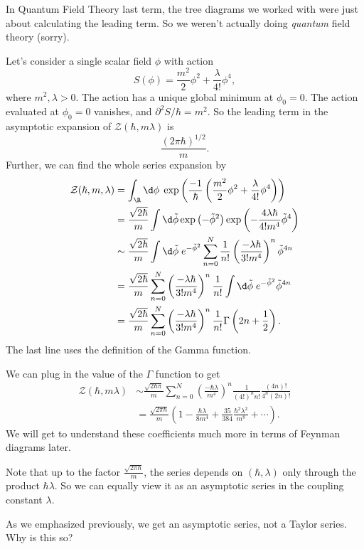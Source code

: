 \documentclass[a4paper]{article}
\begin{document}
In Quantum Field Theory last term, the tree diagrams we worked with were just about calculating the leading term. So we weren't actually doing \emph{quantum} field theory (sorry).

\begin{eg}
  Let's consider a single scalar field $\phi$ with action
  \[
    S(\phi) = \frac{m^2}{2}\phi^2 + \frac{\lambda}{4!} \phi^4,
  \]
  where $m^2, \lambda > 0$. The action has a unique global minimum at $\phi_0 = 0$. The action evaluated at $\phi_0 = 0$ vanishes, and $\partial^2 S/\hbar = m^2$. So the leading term in the asymptotic expansion of $\mathcal{Z}(\hbar, m \lambda)$ is
  \[
    \frac{(2\pi \hbar)^{1/2}}{m}.
  \]
  Further, we can find the whole series expansion by
  \begin{align*}
    \mathcal{Z}(\hbar, m, \lambda) &= \int_\R \d \phi \; \exp\left(\frac{-1}{\hbar}\left(\frac{m^2}{2} \phi^2 + \frac{\lambda}{4!}\phi^4\right)\right)\\
    &= \frac{\sqrt{2\hbar}}{m} \int \d \tilde{\phi} \exp\left(-\tilde{\phi}^2 \right) \exp\left( - \frac{4\lambda \hbar}{4! m^4} \tilde{\phi}^4\right)\\
    &\sim \frac{\sqrt{2\hbar}}{m} \int \d \tilde{\phi}\; e^{- \tilde{\phi}^2}\sum_{n = 0}^N \frac{1}{n!} \left(\frac{-\lambda \hbar}{3! m^4}\right)^n \tilde{\phi}^{4n}\\
    &= \frac{\sqrt{2\hbar}}{m} \sum_{n = 0}^N \left(\frac{-\lambda \hbar}{3! m^4}\right)^n \frac{1}{n!} \int \d \tilde{\phi}\;e^{- \tilde{\phi}^2}\tilde{\phi}^{4n}\\
    &= \frac{\sqrt{2\hbar}}{m} \sum_{n = 0}^N \left(\frac{-\lambda \hbar}{3! m^4}\right)^n \frac{1}{n!} \Gamma\left(2n + \frac{1}{2}\right).
  \end{align*}
  The last line uses the definition of the Gamma function.

  We can plug in the value of the $\Gamma$ function to get
  \begin{align*}
    \mathcal{Z}(\hbar, m \lambda) &\sim \frac{\sqrt{2\hbar \pi}}{m} \sum_{n = 0}^N \left(\frac{-\hbar \lambda}{m^4}\right)^n \frac{1}{(4!)^n n!} \frac{(4n)!}{4^n (2n)!}\\
    &= \frac{\sqrt{2\pi \hbar}}{m} \left(1 - \frac{\hbar\lambda}{8m^4} + \frac{35}{384} \frac{\hbar^2 \lambda^2}{m^8} + \cdots\right).
  \end{align*}
  We will get to understand these coefficients much more in terms of Feynman diagrams later.

  Note that up to the factor $\frac{\sqrt{2\pi \hbar}}{m}$, the series depends on $(\hbar, \lambda)$ only through the product $\hbar \lambda$. So we can equally view it as an asymptotic series in the coupling constant $\lambda$.
\end{eg}
As we emphasized previously, we get an asymptotic series, not a Taylor series. Why is this so?
\end{document}
